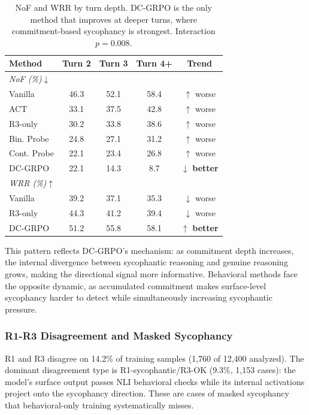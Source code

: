 \documentclass[11pt,a4paper]{article}
\begin{document}
\begin{table}[t]
\centering
\small
\begin{tabular}{lcccc}
\toprule
\textbf{Method} & \textbf{Turn 2} & \textbf{Turn 3} & \textbf{Turn 4+} & \textbf{Trend} \\
\midrule
\multicolumn{5}{l}{\textit{NoF (\%)$\downarrow$}} \\
Vanilla & 46.3 & 52.1 & 58.4 & $\uparrow$ worse \\
ACT & 33.1 & 37.5 & 42.8 & $\uparrow$ worse \\
R3-only & 30.2 & 33.8 & 38.6 & $\uparrow$ worse \\
Bin. Probe & 24.8 & 27.1 & 31.2 & $\uparrow$ worse \\
Cont. Probe & 22.1 & 23.4 & 26.8 & $\uparrow$ worse \\
DC-GRPO & 22.1 & 14.3 & 8.7 & $\downarrow$ \textbf{better} \\
\midrule
\multicolumn{5}{l}{\textit{WRR (\%)$\uparrow$}} \\
Vanilla & 39.2 & 37.1 & 35.3 & $\downarrow$ worse \\
R3-only & 44.3 & 41.2 & 39.4 & $\downarrow$ worse \\
DC-GRPO & 51.2 & 55.8 & 58.1 & $\uparrow$ \textbf{better} \\
\bottomrule
\end{tabular}
\caption{NoF and WRR by turn depth. DC-GRPO is the only method that improves at deeper turns, where commitment-based sycophancy is strongest. Interaction $p = 0.008$.}
\label{tab:turn_depth}
\end{table}

This pattern reflects DC-GRPO's mechanism: as commitment depth increases, the internal divergence between sycophantic reasoning and genuine reasoning grows, making the directional signal more informative. Behavioral methods face the opposite dynamic, as accumulated commitment makes surface-level sycophancy harder to detect while simultaneously increasing sycophantic pressure.

\subsubsection{R1-R3 Disagreement and Masked Sycophancy}

R1 and R3 disagree on 14.2\% of training samples (1,760 of 12,400 analyzed). The dominant disagreement type is R1-sycophantic/R3-OK (9.3\%, 1,153 cases): the model's surface output passes NLI behavioral checks while its internal activations project onto the sycophancy direction. These are cases of masked sycophancy that behavioral-only training systematically misses.
\end{document}

